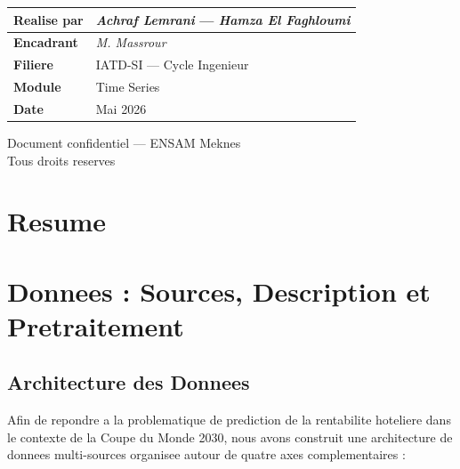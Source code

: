 \documentclass[12pt,a4paper]{report}
\begin{document}
\begin{titlepage}
\vspace{0.8cm}

\begin{center}
\renewcommand{\arraystretch}{1.5}
\begin{tabular}{|p{4cm}|p{9cm}|}
\hline
\rowcolor{primary!8}
\textbf{Realise par}    & \textit{Achraf Lemrani} --- \textit{Hamza  El Faghloumi} \\
\hline
\textbf{Encadrant}      & \textit{M. Massrour } \\
\hline
\rowcolor{primary!8}
\textbf{Filiere}        & IATD-SI --- Cycle Ingenieur \\
\hline
\textbf{Module}          & Time Series \\
\hline
\rowcolor{primary!8}
\textbf{Date}           & Mai 2026 \\
\hline
\end{tabular}
\end{center}

\vfill
\begin{center}
  \textcolor{textgray}{\small
    Document confidentiel --- ENSAM Meknes\\
    Tous droits reserves}
\end{center}
\end{titlepage}

\newpage\thispagestyle{empty}\mbox{}\newpage

\chapter*{Resume}
\thispagestyle{fancy}
\chapter{Donnees : Sources, Description et Pretraitement}

\section{Architecture des Donnees}

Afin de repondre a la problematique de prediction de la rentabilite
hoteliere dans le contexte de la Coupe du Monde 2030, nous avons construit
une architecture de donnees multi-sources organisee autour de quatre axes
complementaires :
\end{document}
